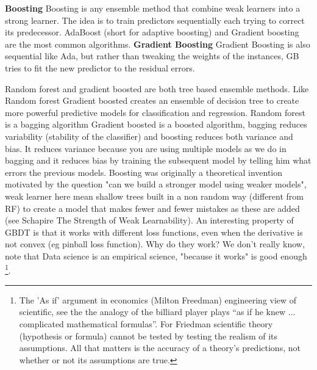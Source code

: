 \documentclass[11pt]{article}
\begin{document}
\textbf{Boosting}
Boosting is any ensemble method that combine weak learners into a strong learner. The idea is to train predictors sequentially each trying to correct its predecessor. AdaBoost (short for adaptive boosting) and Gradient boosting are the most common algorithms.
\textbf{Gradient Boosting}
Gradient Boosting is also sequential like Ada, but rather than tweaking the weights of the instances, GB tries to fit the new predictor to the residual errors.

Random forest and gradient boosted are both tree based ensemble methods. Like Random forest Gradient boosted creates an ensemble of decision tree to create more powerful predictive models for classification and regression. Random forest is a bagging algorithm Gradient boosted is a boosted algorithm, bagging reduces variability (stability of the classifier) and boosting reduces both variance and bias. It reduces variance because you are using multiple models as we do in bagging and it reduces bias by training the subsequent model by telling him what errors the previous models.
Boosting was originally a theoretical invention motivated by the question "can we build a stronger model using weaker models", weak learner here mean shallow trees built in a non random way (different from RF) to create a model that makes fewer and fewer mistakes as these are added (see Schapire The Strength of Weak Learnability). An interesting property of GBDT is that it works with different loss functions, even when the derivative is not convex (eg pinball loss function). %
Why do they work? We don't really know, note that Data science is an empirical science, "because it works" is good enough \footnote{The 'As if' argument in economics (Milton Freedman) engineering view of scientific, see the the analogy of the billiard player plays “as if he knew ... complicated mathematical formulas”. For Friedman scientific theory (hypothesis or formula) cannot be tested by testing the realism of its assumptions.  All that matters is the accuracy of a theory’s predictions, not whether or not its assumptions are true. }. %
\end{document}
